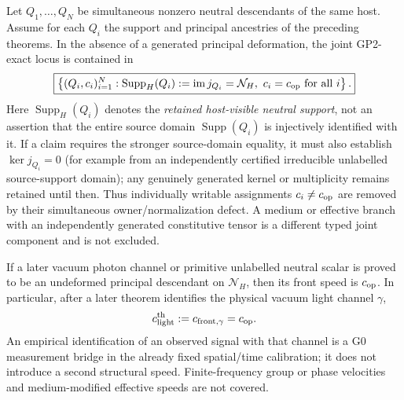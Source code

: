 \documentclass[12pt,a4paper]{article}
\begin{document}
\begin{corollary}
\label{p2a:cor:joint-neutral-principal-saturation}
Let \(Q_1,\ldots,Q_N\) be simultaneous nonzero neutral descendants of the
same host.  Assume for each \(Q_i\) the support and principal ancestries of the
preceding theorems.  In the absence of a generated principal deformation, the
joint GP2-exact locus is contained in
\[
  \boxed{
  \left\{(Q_i,c_i)_{i=1}^{N}:
   \operatorname{Supp}_H(Q_i):=\operatorname{im}j_{Q_i}
                  =\mathcal N_H,
   \ c_i=c_{\rm op}\ \text{for all }i\right\}.}
\]
Here \(\operatorname{Supp}_H(Q_i)\) denotes the \emph{retained
host-visible neutral support}, not an assertion that the entire source
domain \(\operatorname{Supp}(Q_i)\) is injectively identified with it.
If a claim requires the stronger source-domain equality, it must also
establish \(\ker j_{Q_i}=0\) (for example from an independently
certified irreducible unlabelled source-support domain); any genuinely
generated kernel or multiplicity remains retained until then.
Thus individually writable assignments \(c_i\ne c_{\rm op}\) are removed by
their simultaneous owner/normalization defect.  A medium or effective branch
with an independently generated constitutive tensor is a different typed
joint component and is not excluded.
\end{corollary}

\begin{corollary}
\label{p2a:cor:later-light-scalar-speed-inheritance}
If a later vacuum photon channel or primitive unlabelled neutral scalar is
proved to be an undeformed principal descendant on \(\mathcal N_H\), then its
front speed is \(c_{\rm op}\).  In particular, after a later theorem identifies
the physical vacuum light channel \(\gamma\),
\[
 c_{\rm light}^{\rm th}:=c_{{\rm front},\gamma}=c_{\rm op}.
\]
An empirical identification of an observed signal with that channel is a G0
measurement bridge in the already fixed spatial/time calibration; it does not
introduce a second structural speed.  Finite-frequency group or phase
velocities and medium-modified effective speeds are not covered.
\end{corollary}
\end{document}
